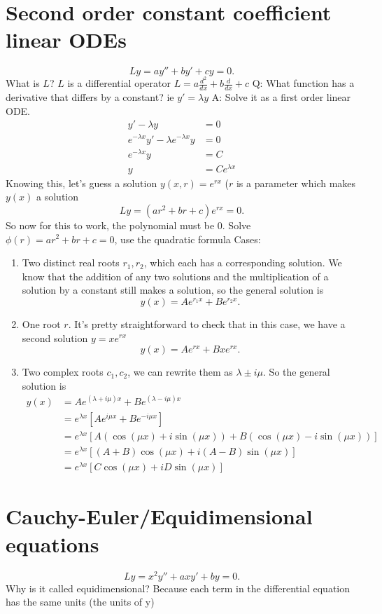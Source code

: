 \documentclass{article}
\begin{document}
\section{Second order constant coefficient linear ODEs}
\[
Ly = ay'' + by' + cy = 0 
.\] 
What is $L$? $L$ is a differential operator $L = a \frac{d^2}{dx} + b \frac{d}{dx} + c$
Q: What function has a derivative that differs by a constant? ie $y' = \lambda y$
A: Solve it as a first order linear ODE. 
\begin{align}
	y' -\lambda y &= 0 \\
	e^{-\lambda x}y' -\lambda e^{-\lambda x}y &= 0 \\
	e^{-\lambda x}y &= C \\
	y &= Ce^{\lambda x} 
\end{align}
Knowing this, let's guess a solution $y(x,r) = e^{rx}$ ($r$ is a parameter which makes $y(x)$ a solution
\[
	Ly = (ar^2 + br + c)e^{rx} = 0
.\]
So now for this to work, the polynomial must be $0$. Solve $\phi(r) = ar^2+br+c = 0$, use the quadratic formula
Cases:
\begin{enumerate}
	\item Two distinct real roots $r_1, r_2$, which each has a corresponding solution. We know that the addition of any two solutions and the multiplication of a solution by a constant still makes a solution, so the general solution is \[
			y(x) = Ae^{r_1x} + Be^{r_2x}
	.\] 
\item One root $r$. It's pretty straightforward to check that in this case, we have a second solution $y = xe^{rx}$ \[
			y(x) = Ae^{rx} + Bxe^{rx}
	.\] 
\item Two complex roots $c_1,c_2$, we can rewrite them as $\lambda \pm i\mu$. So the general solution is 
\begin{align}
	y(x) &= Ae^{(\lambda +i\mu)x} + Be^{(\lambda - i\mu) x} \\
	     &= e^{\lambda x }\left[ Ae^{i\mu x } + Be^{-i\mu x} \right] \\
	     &= e^{\lambda x} \left[ A(\cos(\mu x) +i\sin(\mu x)) + B(\cos(\mu x) -i\sin(\mu x)) \right] \\ 
	     &= e^{\lambda x} \left[ (A+B)\cos(\mu x) + i(A-B)\sin(\mu x)\right] \\
	     &= e^{\lambda x} \left[ C\cos(\mu x) + iD\sin(\mu x)\right]
\end{align}

\end{enumerate}
\section{Cauchy-Euler/Equidimensional equations}
\[
Ly = x^2y'' + axy' + by = 0
.\] 
Why is it called equidimensional? Because each term in the differential equation has the same units (the units of y) \\
\end{document}
